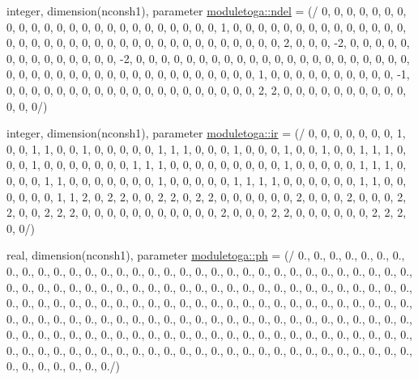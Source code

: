 \begin{DoxyCompactItemize}
\item 
integer, dimension(nconsh1), parameter \mbox{\hyperlink{namespacemoduletoga_ac23302539a90cdd733a9f3722c6c4027}{moduletoga\+::ndel}} = (/ 0, 0, 0, 0, 0, 0, 0, 0, 0, 0, 0, 0, 0, 0, 0, 0, 0, 0, 0, 0, 0, 0, 0, 0, 1, 0, 0, 0, 0, 0, 0, 0, 0, 0, 0, 0, 0, 0, 0, 0, 0, 0, 0, 0, 0, 0, 0, 0, 0, 0, 0, 0, 0, 0, 0, 0, 0, 0, 0, 0, 0, 2, 0, 0, 0, -\/2, 0, 0, 0, 0, 0, 0, 0, 0, 0, 0, 0, 0, 0, 0, -\/2, 0, 0, 0, 0, 0, 0, 0, 0, 0, 0, 0, 0, 0, 0, 0, 0, 0, 0, 0, 0, 0, 0, 0, 0, 0, 0, 0, 0, 0, 0, 0, 0, 0, 0, 0, 0, 0, 0, 0, 0, 0, 0, 1, 0, 0, 0, 0, 0, 0, 0, 0, 0, 0, -\/1, 0, 0, 0, 0, 0, 0, 0, 0, 0, 0, 0, 0, 0, 0, 0, 0, 0, 0, 0, 0, 2, 2, 0, 0, 0, 0, 0, 0, 0, 0, 0, 0, 0, 0, 0/)
\item 
integer, dimension(nconsh1), parameter \mbox{\hyperlink{namespacemoduletoga_afa96c8025ac7806e5ab335cfa4132597}{moduletoga\+::ir}} = (/ 0, 0, 0, 0, 0, 0, 0, 1, 0, 0, 1, 1, 0, 0, 1, 0, 0, 0, 0, 0, 1, 1, 1, 0, 0, 0, 1, 0, 0, 0, 1, 0, 0, 1, 0, 0, 1, 1, 1, 0, 0, 0, 1, 0, 0, 0, 0, 0, 0, 0, 1, 1, 1, 0, 0, 0, 0, 0, 0, 0, 0, 0, 1, 0, 0, 0, 0, 0, 1, 1, 1, 0, 0, 0, 0, 1, 1, 0, 0, 0, 0, 0, 0, 0, 1, 0, 0, 0, 0, 0, 1, 1, 1, 1, 0, 0, 0, 0, 0, 0, 1, 1, 0, 0, 0, 0, 0, 0, 1, 1, 2, 0, 2, 2, 0, 0, 2, 2, 0, 2, 2, 0, 0, 0, 0, 0, 0, 2, 0, 0, 0, 2, 0, 0, 0, 2, 2, 0, 0, 2, 2, 2, 0, 0, 0, 0, 0, 0, 0, 0, 0, 0, 0, 2, 0, 0, 0, 2, 2, 0, 0, 0, 0, 0, 0, 2, 2, 2, 0, 0/)
\item 
real, dimension(nconsh1), parameter \mbox{\hyperlink{namespacemoduletoga_a107a4f3812d78b4dca0cc05213daad21}{moduletoga\+::ph}} = (/ 0., 0., 0., 0., 0., 0., 0., 0., 0., 0., 0., 0., 0., 0., 0., 0., 0., 0., 0., 0., 0., 0., 0., 0., 0., 0., 0., 0., 0., 0., 0., 0., 0., 0., 0., 0., 0., 0., 0., 0., 0., 0., 0., 0., 0., 0., 0., 0., 0., 0., 0., 0., 0., 0., 0., 0., 0., 0., 0., 0., 0., 0., 0., 0., 0., 0., 0., 0., 0., 0., 0., 0., 0., 0., 0., 0., 0., 0., 0., 0., 0., 0., 0., 0., 0., 0., 0., 0., 0., 0., 0., 0., 0., 0., 0., 0., 0., 0., 0., 0., 0., 0., 0., 0., 0., 0., 0., 0., 0., 0., 0., 0., 0., 0., 0., 0., 0., 0., 0., 0., 0., 0., 0., 0., 0., 0., 0., 0., 0., 0., 0., 0., 0., 0., 0., 0., 0., 0., 0., 0., 0., 0., 0., 0., 0., 0., 0., 0., 0., 0., 0., 0., 0., 0., 0., 0., 0., 0., 0., 0., 0., 0., 0., 0., 0., 0., 0., 0., 0., 0./)

\end{DoxyCompactItemize}
